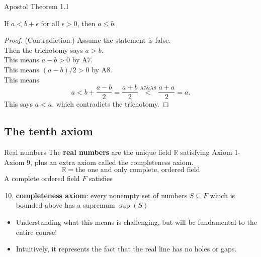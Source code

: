 \documentclass{beamer}
\begin{document}
\begin{frame}{Apostol Theorem 1.1}
\begin{thm}
If $a < b + \epsilon$ for all $\epsilon > 0$, then $a\leq b$.
\end{thm}
\pause
\begin{proof}
(Contradiction.)  Assume the statement is false.\\
\pause
Then the trichotomy says $a > b$.\\
\pause
This means $a-b > 0$ by A7.\\
\pause
This means $(a-b)/2 > 0$ by A8.\\
\pause
This means
$$a < b + \frac{a-b}{2} = \frac{a+b}{2} \stackrel{\text{A7\&A8}}{<} \frac{a+a}{2} = a.$$
\pause
This says $a < a$, which contradicts the trichotomy.
\end{proof}
\end{frame}

\subsection{The tenth axiom}

\begin{frame}{Real numbers}
The \textbf{real numbers} are the unique field $\mathbb{R}$ satisfying Axiom 1-Axiom 9, plus an extra axiom called the completeness axiom.
$$\mathbb{R} = \text{the one and only complete, ordered field}$$
A complete ordered field $F$ satisfies
\begin{enumerate}[\text{A}1]
\setcounter{enumi}{9}
\pause
\item \textbf{completeness axiom}: every nonempty set of numbers $S\subseteq F$ which is bounded above has a supremum $\sup(S)$
\end{enumerate}
\begin{itemize}
\pause
\item Understanding what this means is challenging, but will be fundamental to the entire course!
\pause
\item Intuitively, it represents the fact that the real line has no holes or gaps.
\end{itemize}
\end{frame}
\end{document}
